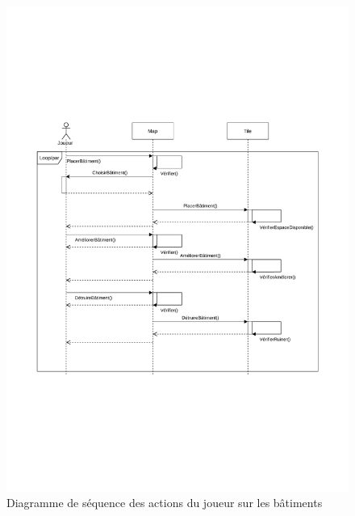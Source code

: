 \documentclass[12pt]{article}
\begin{document}
\begin{figure}[H]
    \includegraphics[width=\textwidth]{uml-sequence-2}
    \caption{Diagramme de séquence des actions du joueur sur les bâtiments\label{fig:seq-player}}
\end{figure}

\end{document}
